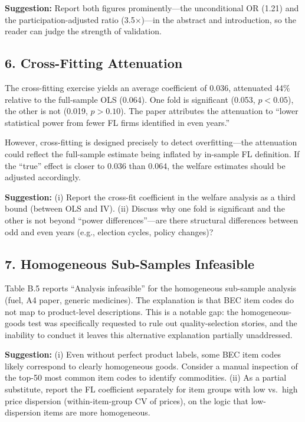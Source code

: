 \documentclass[12pt]{article}
\begin{document}
\noindent\textbf{Suggestion:} Report both figures prominently---the
unconditional OR (1.21) and the participation-adjusted ratio
(3.5$\times$)---in the abstract and introduction, so the reader can
judge the strength of validation.

\subsection*{6. Cross-Fitting Attenuation}

The cross-fitting exercise yields an average coefficient of 0.036,
attenuated 44\% relative to the full-sample OLS (0.064). One fold is
significant (0.053, $p < 0.05$), the other is not (0.019, $p > 0.10$).
The paper attributes the attenuation to ``lower statistical power from
fewer FL firms identified in even years.''

However, cross-fitting is designed precisely to detect overfitting---the
attenuation could reflect the full-sample estimate being inflated by
in-sample FL definition. If the ``true'' effect is closer to 0.036 than
0.064, the welfare estimates should be adjusted accordingly.

\noindent\textbf{Suggestion:} (i) Report the cross-fit coefficient in
the welfare analysis as a third bound (between OLS and IV). (ii)
Discuss why one fold is significant and the other is not beyond ``power
differences''---are there structural differences between odd and even
years (e.g., election cycles, policy changes)?

\subsection*{7. Homogeneous Sub-Samples Infeasible}

Table B.5 reports ``Analysis infeasible'' for the homogeneous sub-sample
analysis (fuel, A4 paper, generic medicines). The explanation is that
BEC item codes do not map to product-level descriptions. This is a
notable gap: the homogeneous-goods test was specifically requested to
rule out quality-selection stories, and the inability to conduct it
leaves this alternative explanation partially unaddressed.

\noindent\textbf{Suggestion:} (i) Even without perfect product labels,
some BEC item codes likely correspond to clearly homogeneous goods.
Consider a manual inspection of the top-50 most common item codes to
identify commodities. (ii) As a partial substitute, report the FL
coefficient separately for item groups with low vs.\ high price
dispersion (within-item-group CV of prices), on the logic that
low-dispersion items are more homogeneous.
\end{document}

